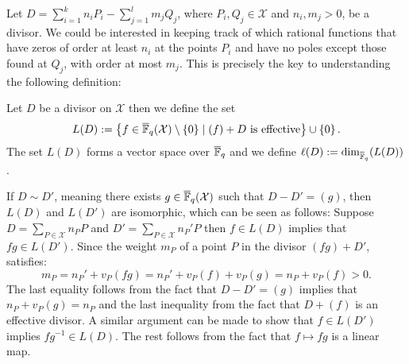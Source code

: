 
Let $D = \sum_{i = 1}^{k} n_{i}P_{i} - \sum^{l}_{j = 1} m_{j} Q_{j}$, where $P_{i}, Q_{j} \in \mathcal{X}$ and $n_{i}, m_{j} > 0$, be a divisor.
We could be interested in keeping track of which rational functions that have zeros of order at least $n_{i}$ at the points $P_{i}$ and have no poles except those found at $Q_{j}$, with order at most $m_{j}$.
This is precisely the key to understanding the following definition:
\begin{definition}
  Let $D$ be a divisor on $\mathcal{X}$ then we define the set
  \begin{equation*}
    L(D) := \left\{f \in \overline{\mathbb{F}}_{q}(\mathcal{X}) \setminus \left\{0\right\} \mid (f) + D \text{ is effective}\right\} \cup \left\{0\right\}.
  \end{equation*}
  The set $L(D)$ forms a vector space over $\overline{\mathbb{F}}_{q}$ and we define $\ell(D) := \dim_{\overline{\mathbb{F}}_{q}}(L(D))$.
\end{definition}
\begin{remark}\label{rem:vector_spaces_of_equivilent_divsors_are_isomorphic}
  If $D \sim D'$, meaning there exists $g \in \overline{\mathbb{F}}_{q}(\mathcal{X})$ such that $D - D' = (g)$, then $L(D)$ and $L(D')$ are isomorphic, which can be seen as follows: Suppose $D = \sum_{P\in \mathcal{X}} n_{P}P$ and $D' = \sum_{P \in \mathcal{X}} n_P'P$ then $f \in L(D)$ implies that $fg \in L(D')$. Since the weight $m_{P}$ of a point $P$ in the divisor $(fg) + D'$, satisfies:
  \begin{equation*}
    m_{P} = n_{P}' + v_{P}(fg) = n_{P}' + v_{P}(f) + v_{P}(g) = n_{P} + v_{P}(f) > 0.
  \end{equation*}
  The last equality follows from the fact that $D - D' = (g)$ implies that $n_{P} + v_{P}(g) = n_{P}$ and the last inequality from the fact that $D + (f)$ is an effective divisor. A similar argument can be made to show that $f \in L(D')$ implies $fg^{-1} \in L(D)$. The rest follows from the fact that $f \mapsto fg$ is a linear map.
\end{remark}

